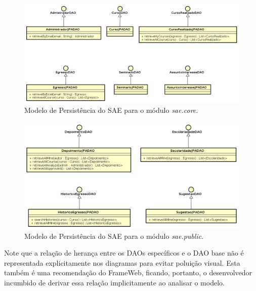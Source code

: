 \begin{figure}[!h]
  \centering
  \includegraphics[width=1\textwidth]{figuras/modelopersistencecore.png}
  \caption{Modelo de Persistência do SAE para o módulo \textit{sae.core}.}
  \label{figura-modelo-persistencia-core}
\end{figure}

\newpage

\begin{figure}[!h]
  \centering
  \includegraphics[width=1\textwidth]{figuras/modelopersistencepublico.png}
  \caption{Modelo de Persistência do SAE para o módulo \textit{sae.public}.}
  \label{figura-modelo-persistencia-publico}
\end{figure}




Note que a relação de herança entre os DAOs específicos e o DAO base não é representada explicitamente nos diagramas para evitar poluição visual. Esta também é uma recomendação do FrameWeb, ficando, portanto, o desenvolvedor incumbido de derivar essa relação implicitamente ao analisar o modelo.



